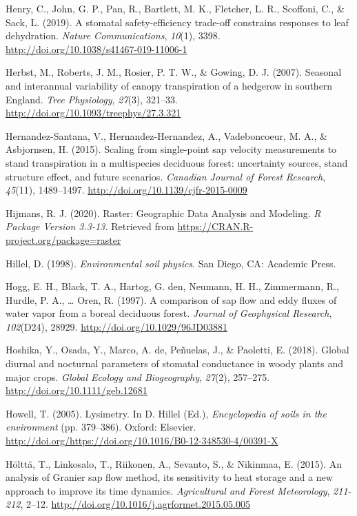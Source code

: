 \documentclass[11pt,twoside]{reedthesis}
\begin{document}
\hypertarget{ref-henry_stomatal_2019}{}
Henry, C., John, G. P., Pan, R., Bartlett, M. K., Fletcher, L. R.,
Scoffoni, C., \& Sack, L. (2019). A stomatal safety-efficiency trade-off
constrains responses to leaf dehydration. \emph{Nature Communications},
\emph{10}(1), 3398. \url{http://doi.org/10.1038/s41467-019-11006-1}

\hypertarget{ref-Herbst2007}{}
Herbst, M., Roberts, J. M., Rosier, P. T. W., \& Gowing, D. J. (2007).
Seasonal and interannual variability of canopy transpiration of a
hedgerow in southern England. \emph{Tree Physiology}, \emph{27}(3),
321--33. \url{http://doi.org/10.1093/treephys/27.3.321}

\hypertarget{ref-Hernandez-Santana2015}{}
Hernandez-Santana, V., Hernandez-Hernandez, A., Vadeboncoeur, M. A., \&
Asbjornsen, H. (2015). Scaling from single-point sap velocity
measurements to stand transpiration in a multispecies deciduous forest:
uncertainty sources, stand structure effect, and future scenarios.
\emph{Canadian Journal of Forest Research}, \emph{45}(11), 1489--1497.
\url{http://doi.org/10.1139/cjfr-2015-0009}

\hypertarget{ref-hijmans_raster_2020}{}
Hijmans, R. J. (2020). Raster: Geographic Data Analysis and Modeling.
\emph{R Package Version 3.3-13.} Retrieved from
\url{https://CRAN.R-project.org/package=raster}

\hypertarget{ref-hillel_environmental_1998}{}
Hillel, D. (1998). \emph{Environmental soil physics}. San Diego, CA:
Academic Press.

\hypertarget{ref-Hogg1997}{}
Hogg, E. H., Black, T. A., Hartog, G. den, Neumann, H. H., Zimmermann,
R., Hurdle, P. A., \ldots{} Oren, R. (1997). A comparison of sap flow
and eddy fluxes of water vapor from a boreal deciduous forest.
\emph{Journal of Geophysical Research}, \emph{102}(D24), 28929.
\url{http://doi.org/10.1029/96JD03881}

\hypertarget{ref-hoshika_global_2018}{}
Hoshika, Y., Osada, Y., Marco, A. de, Peñuelas, J., \& Paoletti, E.
(2018). Global diurnal and nocturnal parameters of stomatal conductance
in woody plants and major crops. \emph{Global Ecology and Biogeography},
\emph{27}(2), 257--275. \url{http://doi.org/10.1111/geb.12681}

\hypertarget{ref-Howell2005}{}
Howell, T. (2005). Lysimetry. In D. Hillel (Ed.), \emph{Encyclopedia of
soils in the environment} (pp. 379--386). Oxford: Elsevier.
\url{http://doi.org/https://doi.org/10.1016/B0-12-348530-4/00391-X}

\hypertarget{ref-Holtta2015}{}
Hölttä, T., Linkosalo, T., Riikonen, A., Sevanto, S., \& Nikinmaa, E.
(2015). An analysis of Granier sap flow method, its sensitivity to heat
storage and a new approach to improve its time dynamics.
\emph{Agricultural and Forest Meteorology}, \emph{211-212}, 2--12.
\url{http://doi.org/10.1016/j.agrformet.2015.05.005}
\end{document}
